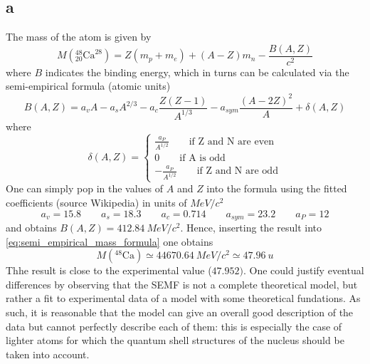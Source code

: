 \subsection*{a}
The mass of the atom is given by
\begin{equation*}
    M(^{48}_{20}\text{Ca}^{28}) = Z(m_p + m_e) + (A-Z)m_n - \frac{B(A, Z)}{c^2}
    \label{eq:semi_empirical_mass_formula}
\end{equation*}
where $B$ indicates the binding energy, which in turns can be calculated via the semi-empirical formula (atomic units)
\begin{equation}
    B(A, Z)= a_v A - a_s A^{2/3} - a_c \frac{Z(Z-1)}{A^{1/3}} - a_{sym} \frac{(A - 2Z)^2}{A} + \delta (A, Z)
    \label{eq:semi_empirical_BE_formula}
\end{equation}
where 
\begin{equation*}
    \delta(A, Z) = 
    \begin{cases}
        \frac{a_P}{A^{1/2}} \qquad \text{if Z and N are even} \\
        0 \qquad \text{if A is odd} \\
        -\frac{a_P}{A^{1/2}} \qquad \text{if Z and N are odd} 
    \end{cases}
\end{equation*}
One can simply pop in the values of $A$ and $Z$ into the formula using the fitted coefficients (source Wikipedia) in units of $MeV/c^2$
\begin{equation*}
    a_v = 15.8 \qquad a_s = 18.3 \qquad a_c = 0.714 \qquad a_{sym} = 23.2 \qquad a_P = 12
\end{equation*}
and obtains $B(A, Z) = 412.84~MeV/c^2$. Hence, inserting the result into \ref{eq:semi_empirical_mass_formula} one obtains
\begin{equation*}
    M(^{48}\text{Ca}) \simeq 44670.64~MeV/c^2 \simeq 47.96~u
\end{equation*}
Thhe result is close to the experimental value ($47.952)$. One could justify eventual differences by observing that the SEMF is 
not a complete theoretical model, but rather a fit to experimental data of a model with some theoretical fundations. As such, it is reasonable that the model
can give an overall good description of the data but cannot perfectly describe each of them: this is especially the case of lighter atoms for which
the quantum shell structures of the nucleus should be taken into account.

